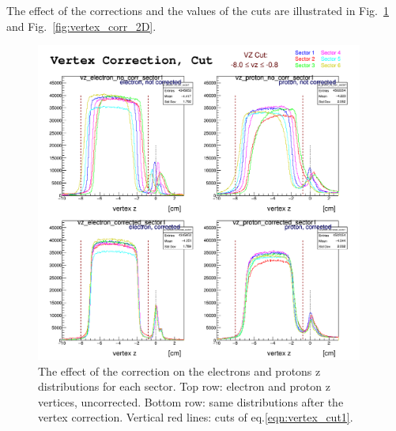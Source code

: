 The effect of the corrections and the values of the cuts are illustrated in 
Fig.~\ref{fig:vertex_corr} and  Fig.~\ref{fig:vertex_corr_2D}.

\begin{figure}[h]
	\centering
		\includegraphics[width=0.96\textwidth ]{img/vtx_all_sector.png}
			\caption{The effect of the correction on the electrons and protons z 
						distributions for each sector. Top row: electron and proton
						z vertices, uncorrected. Bottom row: same distributions after
						the vertex correction. Vertical red lines: cuts of eq.\ref{eqn:vertex_cut1}. }
			\label{fig:vertex_corr}
\end{figure}

